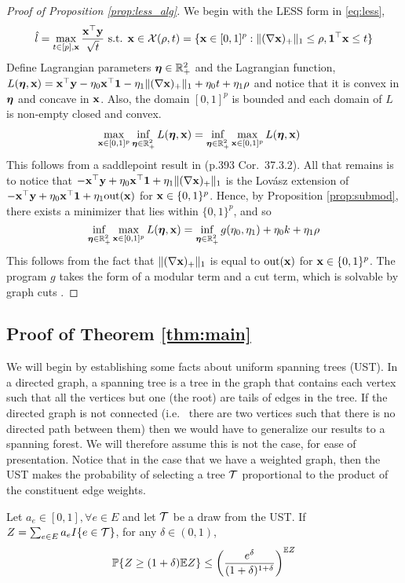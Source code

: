 \begin{proof}[Proof of Proposition \ref{prop:less_alg}]
We begin with the LESS form in \eqref{eq:less},
\[
\hat l = \max_{t \in [p], \mathbf{x}} \frac{\mathbf{x}^\top \mathbf{y}}{\sqrt{t}} \textrm{ s.t. } \mathbf{x} \in \mathcal{X}(\rho,t) = \{ \mathbf{x} \in [0,1]^p : \| (\nabla \mathbf{x})_+ \|_1 \le \rho, {\bf 1}^\top \mathbf{x} \le t \}
\]
Define Lagrangian parameters $\bm{\eta} \in \mathbb{R}_+^2$ and the Lagrangian function, $L(\bm{\eta}, \mathbf{x}) = \mathbf{x}^\top \mathbf{y} - \eta_0 \mathbf{x}^\top {\bf 1} - \eta_1 \|(\nabla \mathbf{x})_+ \|_1 + \eta_0 t + \eta_1 \rho$ and notice that it is convex in $\bm{\eta}$ and concave in $\mathbf{x}$.
Also, the domain $[0,1]^p$ is bounded and each domain of $L$ is non-empty closed and convex.
\[
\begin{aligned}
&\max_{\mathbf{x} \in [0,1]^p} \inf_{\bm{\eta} \in \mathbb{R}_+^2} L(\bm{\eta}, \mathbf{x}) = \inf_{\bm{\eta} \in \mathbb{R}_+^2} \max_{\mathbf{x} \in [0,1]^p} L(\bm{\eta}, \mathbf{x})
\end{aligned}
\]
This follows from a saddlepoint result in \cite{rockafellar1997convex} (p.393 Cor.~37.3.2).
All that remains is to notice that $-\mathbf{x}^\top \mathbf{y} + \eta_0 \mathbf{x}^\top {\bf 1} + \eta_1 \|(\nabla \mathbf{x})_+ \|_1$ is the Lov\'asz extension of $-\mathbf{x}^\top \mathbf{y} + \eta_0 \mathbf{x}^\top {\bf 1} + \eta_1 \textrm{out}(\mathbf{x})$ for $\mathbf{x} \in \{0,1\}^p$.
Hence, by Proposition \ref{prop:submod}, there exists a minimizer that lies within $\{0,1\}^p$, and so 
\[
\inf_{\bm{\eta} \in \mathbb{R}_+^2} \max_{\mathbf{x} \in [0,1]^p} L(\bm{\eta}, \mathbf{x}) = \inf_{\bm{\eta} \in \mathbb{R}_+^2} g(\eta_0,\eta_1) + \eta_0 k + \eta_1 \rho
\]
This follows from the fact that $\| (\nabla \mathbf{x})_+ \|_1$ is equal to $\textrm{out}(\mathbf{x})$ for $\mathbf{x} \in \{0,1\}^p$. 
The program $g$ takes the form of a modular term and a cut term, which is solvable by graph cuts \cite{cormen2001introduction}.
\end{proof}


\subsection{Proof of Theorem \ref{thm:main}}
We will begin by establishing some facts about uniform spanning trees (UST).
In a directed graph, a spanning tree is a tree in the graph that contains each vertex such that all the vertices but one (the root) are tails of edges in the tree.
If the directed graph is not connected (i.e.~ there are two vertices such that there is no directed path between them) then we would have to generalize our results to a spanning forest.
We will therefore assume this is not the case, for ease of presentation.
Notice that in the case that we have a weighted graph, then the UST makes the probability of selecting a tree ${\mathcal{T}}$ proportional to the product of the constituent edge weights.
\begin{lemma}{\cite{fung2010graph}}
\label{lem:UST_conc}
Let $a_e \in [0,1], \forall e \in E$ and let ${\mathcal{T}}$ be a draw from the UST.  If $Z = \sum_{e \in E} a_e I\{e \in {\mathcal{T}}\}$, for any $\delta \in (0,1)$,
\[
\mathbb{P} \{ Z \ge (1 + \delta) \mathbb{E} Z\} \le \left( \frac{e^\delta}{(1 + \delta)^{1 + \delta}}\right)^{\mathbb{E} Z}
\]  
\end{lemma}

